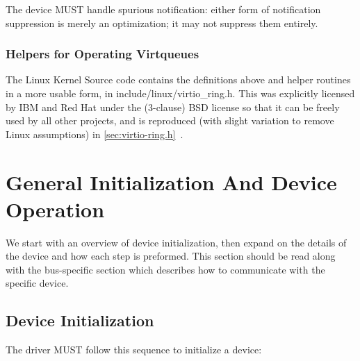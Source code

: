 The device MUST handle spurious notification: either form of
notification suppression is merely an optimization; it may not
suppress them entirely.

\subsection{Helpers for Operating Virtqueues}\label{sec:Basic Facilities of a Virtio Device / Virtqueues / Helpers for Operating Virtqueues}

The Linux Kernel Source code contains the definitions above and
helper routines in a more usable form, in
include/linux/virtio_ring.h. This was explicitly licensed by IBM
and Red Hat under the (3-clause) BSD license so that it can be
freely used by all other projects, and is reproduced (with slight
variation to remove Linux assumptions) in \ref{sec:virtio-ring.h}~.

\chapter{General Initialization And Device Operation}\label{sec:General Initialization And Device Operation}

We start with an overview of device initialization, then expand on the
details of the device and how each step is preformed.  This section
should be read along with the bus-specific section which describes
how to communicate with the specific device.

\section{Device Initialization}\label{sec:General Initialization And Device Operation / Device Initialization}

The driver MUST follow this sequence to initialize a device:

